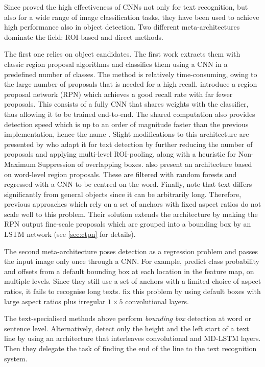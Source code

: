 		Since \citet{ciresan} proved the high effectiveness of CNNs not only for text recognition, but also for a wide range of image classification tasks, they have been used to achieve high performance also in object detection. Two different meta-architectures dominate the field: ROI-based and direct methods.

		The first one relies on object candidates. The first work \citep{fast_rcnn} extracts them with classic region proposal algorithms and classifies them using a CNN in a predefined number of classes. The method is relatively time-consuming, owing to the large number of proposals that is needed for a high recall.  introduce a region proposal network (RPN) which achieves a good recall rate with far fewer proposals. This consists of a fully CNN that shares weights with the classifier, thus allowing it to be trained end-to-end. The shared computation also provides detection speed which is up to an order of magnitude faster than the previous implementation, hence the name \FRCNN{}. Slight modifications to this architecture are presented by \citet{deeptext} who adapt it for text detection by further reducing the number of proposals and applying multi-level ROI-pooling, along with a heuristic for Non-Maximum Suppression of overlapping boxes.  also present an architecture based on word-level region proposals. These are filtered with random forests and regressed with a CNN to be centred on the word. Finally, \citet{ctpn} note that text differs significantly from general objects since it can be arbitrarily long. Therefore, previous approaches which rely on a set of anchors with fixed aspect ratios do not scale well to this problem. Their solution extends the \FRCNN{} architecture by making the RPN output fine-scale proposals which are grouped into a bounding box by an LSTM network (see \autoref{sec:ctpn} for details).

		The second meta-architecture poses detection as a regression problem and passes the input image only once through a CNN. For example, \citet{ssd} predict class probability and offsets from a default bounding box at each location in the feature map, on multiple levels. Since they still use a set of anchors with a limited choice of aspect ratios, it fails to recognise long texts.  fix this problem by using default boxes with large aspect ratios plus irregular $1 \times 5$ convolutional layers.

		The text-specialised methods above perform \emph{bounding box} detection at word or sentence level. Alternatively, \citet{moysset_whereToStart} detect only the height and the left start of a text line by using an architecture that interleaves convolutional and MD-LSTM layers. Then they delegate the task of finding the end of the line to the text recognition system.

